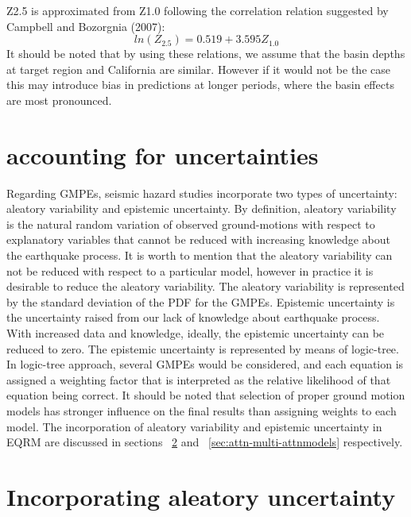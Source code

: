 Z2.5 is approximated from Z1.0 following the correlation relation
suggested by Campbell and Bozorgnia (2007):
\begin{equation}
ln(Z_{2.5}) = 0.519+3.595Z_{1.0}
\end{equation}
It should be noted that by using these relations, we assume that the
basin depths at target region and California are similar. However if
it would not be the case this may introduce bias in predictions at
longer periods, where the basin effects are most pronounced.





\section{accounting for uncertainties}\label{sec:uncertain}
Regarding GMPEs, seismic hazard studies incorporate two types of
uncertainty: aleatory variability and epistemic uncertainty. By
definition, aleatory variability is the natural random variation of
observed ground-motions with respect to explanatory variables that
cannot be reduced with increasing knowledge about the earthquake
process. It is worth to mention that the aleatory variability can
not be reduced with respect to a particular model, however in
practice it is desirable to reduce the aleatory variability. The
aleatory variability is represented by the standard deviation of the
PDF for the GMPEs. Epistemic uncertainty is the uncertainty raised
from our lack of knowledge about earthquake process. With increased
data and knowledge, ideally, the epistemic uncertainty can be
reduced to zero. The epistemic uncertainty is represented by means
of logic-tree. In logic-tree approach, several GMPEs would be
considered, and each equation is assigned a weighting factor that is
interpreted as the relative likelihood of that equation being
correct. It should be noted that selection of proper ground motion
models has stronger influence on the final results than assigning
weights to each model. The incorporation of aleatory variability and
epistemic uncertainty in EQRM are discussed in sections
~\ref{attn:uncertainty} and ~\ref{sec:attn-multi-attnmodels}
respectively.




\section{Incorporating aleatory uncertainty}
\label{attn:uncertainty}

